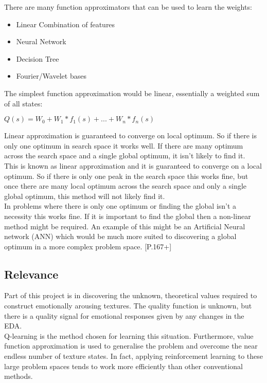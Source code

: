 \documentclass{report}
\begin{document}
There are many function approximators that can be used to learn the weights:
\begin{itemize}
	\item Linear Combination of features
	\item Neural Network
	\item Decision Tree
	\item Fourier/Wavelet bases
\end{itemize}

The simplest function approximation would be linear, essentially a weighted sum of all states:

\vspace{0.5cm}

\centerline{$Q(s) = W_0 + W_1 * f_1(s) + ... + W_n * f_n(s)$}

Linear approximation is guaranteed to converge on local optimum. So if there is only one optimum in search space it works well. If there are many optimum across the search space and a single
global optimum, it isn't likely to find it.\\

This is known as linear approximation and it is guaranteed to converge on a local optimum. So if there is only one peak in the search space this works fine, but once 
there are many local optimum across the search space and only a single global optimum, this method will not likely find it.\\
In problems where there is only one optimum or finding the global isn't a necessity this works fine. If it is important to find the global then a non-linear method might be required. An example of this might be an Artificial Neural network (ANN) which would be much more suited to discovering a global optimum in a more complex problem space. \citep{sutton1998reinforcement} [P.167+]


\subsection{Relevance}

Part of this project is in discovering the unknown, theoretical values required to construct emotionally arousing textures. The quality function is unknown, but there is a 
quality signal for emotional responses given by any changes in the EDA.\\
Q-learning is the method chosen for learning this situation. Furthermore, value function approximation is used to generalise the problem and overcome the near endless number of 
texture states. In fact, applying reinforcement learning to these large problem spaces tends to work more efficiently than other conventional methods.
\end{document}
